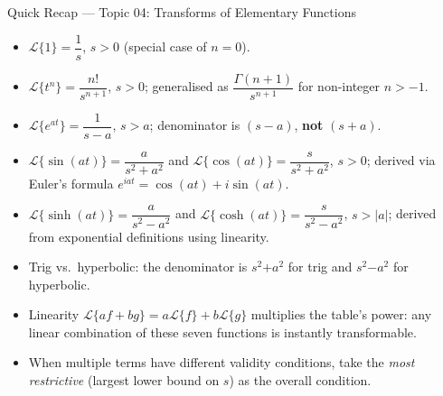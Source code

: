 \documentclass[12pt,a4paper]{article}
\begin{document}
\begin{learnbox}{Quick Recap --- Topic 04: Transforms of Elementary Functions}
\begin{itemize}[leftmargin=*]
  \item $\mathcal{L}\{1\} = \dfrac{1}{s}$, \quad $s > 0$ (special case of $n=0$).
  \item $\mathcal{L}\{t^n\} = \dfrac{n!}{s^{n+1}}$, \quad $s > 0$; generalised as
        $\dfrac{\Gamma(n+1)}{s^{n+1}}$ for non-integer $n > -1$.
  \item $\mathcal{L}\{e^{at}\} = \dfrac{1}{s-a}$, \quad $s > a$; denominator is
        $(s-a)$, \textbf{not} $(s+a)$.
  \item $\mathcal{L}\{\sin(at)\} = \dfrac{a}{s^2+a^2}$ and
        $\mathcal{L}\{\cos(at)\} = \dfrac{s}{s^2+a^2}$, \quad $s > 0$;
        derived via Euler's formula $e^{iat} = \cos(at)+i\sin(at)$.
  \item $\mathcal{L}\{\sinh(at)\} = \dfrac{a}{s^2-a^2}$ and
        $\mathcal{L}\{\cosh(at)\} = \dfrac{s}{s^2-a^2}$, \quad $s > |a|$;
        derived from exponential definitions using linearity.
  \item Trig vs.\ hyperbolic: the denominator is $s^2 \mathbf{+} a^2$ for trig and
        $s^2 \mathbf{-} a^2$ for hyperbolic.
  \item Linearity $\mathcal{L}\{af+bg\} = a\mathcal{L}\{f\} + b\mathcal{L}\{g\}$ multiplies
        the table's power: any linear combination of these seven functions is instantly
        transformable.
  \item When multiple terms have different validity conditions, take the \emph{most
        restrictive} (largest lower bound on $s$) as the overall condition.
\end{itemize}
\end{learnbox}
\end{document}
